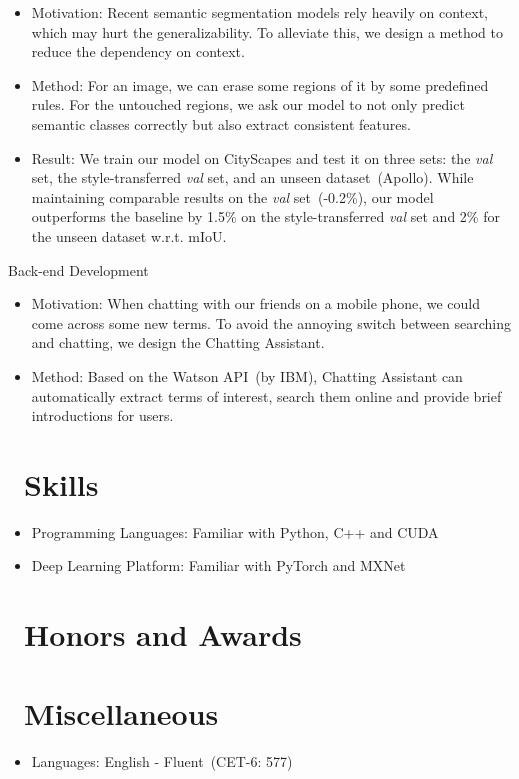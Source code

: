 \documentclass{resume}
\begin{document}
\begin{itemize}
	\item Motivation: Recent semantic segmentation models rely heavily on context, which may hurt the generalizability. To alleviate this, we design a method to reduce the dependency on context.
	\item Method: For an image, we can erase some regions of it by some predefined rules. For the untouched regions, we ask our model to not only predict semantic classes correctly but also extract consistent features.
	\item Result: We train our model on CityScapes and test it on three sets: the \textit{val} set, the style-transferred \textit{val} set, and an unseen dataset~(Apollo). While maintaining comparable results on the \textit{val} set~(-0.2\%), our model outperforms the baseline by 1.5\% on the style-transferred \textit{val} set and 2\% for the unseen dataset w.r.t. mIoU.
\end{itemize}

 {Back-end Development}
\begin{itemize}
	\item Motivation: When chatting with our friends on a mobile phone, we could come across some new terms. To avoid the annoying switch between searching and chatting, we design the Chatting Assistant. 
	\item Method: Based on the Watson API~(by IBM), Chatting Assistant can automatically extract terms of interest, search them online and provide brief introductions for users.
\end{itemize}



\section{\faCogs\ Skills}
\begin{itemize}[parsep=0.5ex]
  \item Programming Languages: Familiar with Python, C++ and CUDA
  \item Deep Learning Platform: Familiar with PyTorch and MXNet
\end{itemize}

\section{\faHeartO\ Honors and Awards}

\section{\faInfo\ Miscellaneous}
\begin{itemize}
  \item Languages: English - Fluent~(CET-6: 577)
\end{itemize}

%
%
\end{document}
